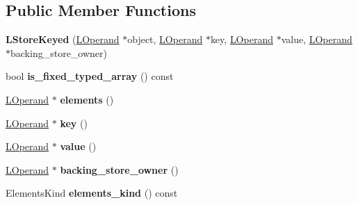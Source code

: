 \subsection*{Public Member Functions}
\begin{DoxyCompactItemize}
\item 
{\bfseries L\+Store\+Keyed} (\hyperlink{classv8_1_1internal_1_1_l_operand}{L\+Operand} $\ast$object, \hyperlink{classv8_1_1internal_1_1_l_operand}{L\+Operand} $\ast$key, \hyperlink{classv8_1_1internal_1_1_l_operand}{L\+Operand} $\ast$value, \hyperlink{classv8_1_1internal_1_1_l_operand}{L\+Operand} $\ast$backing\+\_\+store\+\_\+owner)\hypertarget{classv8_1_1internal_1_1_l_store_keyed_a40acd77f50898d8601b8587509f6443f}{}\label{classv8_1_1internal_1_1_l_store_keyed_a40acd77f50898d8601b8587509f6443f}

\item 
bool {\bfseries is\+\_\+fixed\+\_\+typed\+\_\+array} () const \hypertarget{classv8_1_1internal_1_1_l_store_keyed_a9e741b26eae820e0effc84187cef9fd1}{}\label{classv8_1_1internal_1_1_l_store_keyed_a9e741b26eae820e0effc84187cef9fd1}

\item 
\hyperlink{classv8_1_1internal_1_1_l_operand}{L\+Operand} $\ast$ {\bfseries elements} ()\hypertarget{classv8_1_1internal_1_1_l_store_keyed_a65b49dc68849be2f341b9f6db3399248}{}\label{classv8_1_1internal_1_1_l_store_keyed_a65b49dc68849be2f341b9f6db3399248}

\item 
\hyperlink{classv8_1_1internal_1_1_l_operand}{L\+Operand} $\ast$ {\bfseries key} ()\hypertarget{classv8_1_1internal_1_1_l_store_keyed_a768f44140c1abab8ec345ef73cb417ea}{}\label{classv8_1_1internal_1_1_l_store_keyed_a768f44140c1abab8ec345ef73cb417ea}

\item 
\hyperlink{classv8_1_1internal_1_1_l_operand}{L\+Operand} $\ast$ {\bfseries value} ()\hypertarget{classv8_1_1internal_1_1_l_store_keyed_a6a97e536a0eed02971eb915a57b6e898}{}\label{classv8_1_1internal_1_1_l_store_keyed_a6a97e536a0eed02971eb915a57b6e898}

\item 
\hyperlink{classv8_1_1internal_1_1_l_operand}{L\+Operand} $\ast$ {\bfseries backing\+\_\+store\+\_\+owner} ()\hypertarget{classv8_1_1internal_1_1_l_store_keyed_a21d192f5ddd6bbb5198880a6e2d03db3}{}\label{classv8_1_1internal_1_1_l_store_keyed_a21d192f5ddd6bbb5198880a6e2d03db3}

\item 
Elements\+Kind {\bfseries elements\+\_\+kind} () const \hypertarget{classv8_1_1internal_1_1_l_store_keyed_a09fd8ff5055daa16ec86a8f9bf4a1388}{}\label{classv8_1_1internal_1_1_l_store_keyed_a09fd8ff5055daa16ec86a8f9bf4a1388}


\end{DoxyCompactItemize}
